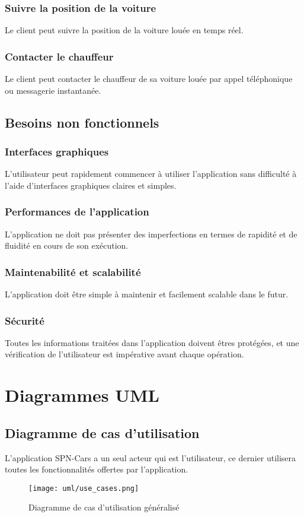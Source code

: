 \subsubsection{Suivre la position de la voiture}
Le client peut suivre la position de la voiture louée en temps réel.
\subsubsection{Contacter le chauffeur}
Le client peut contacter le chauffeur de sa voiture louée par appel téléphonique ou messagerie instantanée.
\subsection{Besoins non fonctionnels}
\subsubsection{Interfaces graphiques}
L'utilisateur peut rapidement commencer à utiliser l'application sans difficulté à l'aide d'interfaces graphiques claires et simples.
\subsubsection{Performances de l'application}
L'application ne doit pas présenter des imperfections en termes de rapidité et de fluidité en cours de son exécution.
\subsubsection{Maintenabilité et scalabilité}
L'application doit être simple à maintenir et facilement scalable dans le futur.
\subsubsection{Sécurité}
Toutes les informations traitées dans l'application doivent êtres protégées, et une vérification de l'utilisateur est impérative avant chaque opération.
\section{Diagrammes UML}
\subsection{Diagramme de cas d'utilisation}
L'application SPN-Cars a un seul acteur qui est l'utilisateur, ce dernier utilisera toutes les fonctionnalités offertes par l'application.
\begin{figure}[H]
    \centering
    \texttt{[image: uml/use\_cases.png]}
    \vspace{1cm}
    \captionsetup{justification=centering}
    \caption{Diagramme de cas d'utilisation généralisé}
    \label{fig:use_case_diag}
\end{figure}
